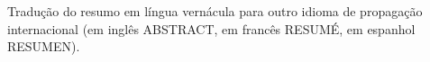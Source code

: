 Tradução do resumo em língua vernácula para outro idioma de propagação internacional (em inglês ABSTRACT, em francês RESUMÉ, em espanhol RESUMEN).

